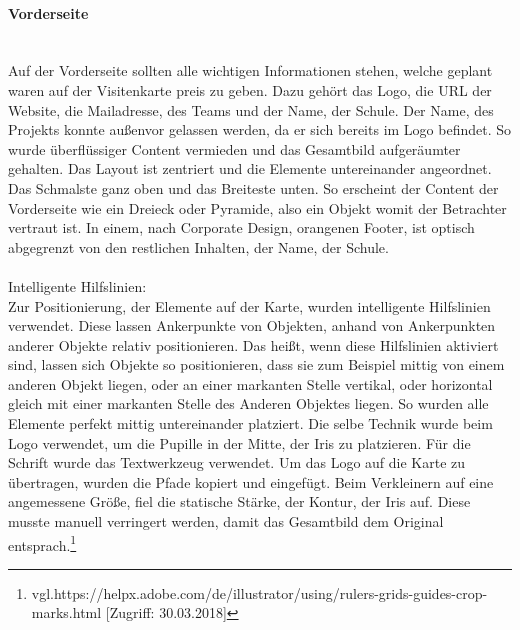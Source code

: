 \paragraph{Vorderseite}
\leavevmode \\
Auf der Vorderseite sollten alle wichtigen Informationen stehen, welche geplant waren auf der Visitenkarte preis zu geben. Dazu gehört das Logo, die URL der Website, die Mailadresse, des Teams und der Name, der Schule. Der Name, des Projekts konnte außenvor gelassen werden, da er sich bereits im Logo befindet. So wurde überflüssiger Content vermieden und das Gesamtbild aufgeräumter gehalten. Das Layout ist zentriert und die Elemente untereinander angeordnet. Das Schmalste ganz oben und das Breiteste unten. So erscheint der Content der Vorderseite wie ein Dreieck oder Pyramide, also ein Objekt womit der Betrachter vertraut ist. In einem, nach Corporate Design, orangenen Footer, ist optisch abgegrenzt von den restlichen Inhalten, der Name, der Schule.
\leavevmode \\
\leavevmode \\
Intelligente Hilfslinien: 
\leavevmode \\
Zur Positionierung, der Elemente auf der Karte, wurden intelligente Hilfslinien verwendet. Diese lassen Ankerpunkte von Objekten, anhand von Ankerpunkten anderer Objekte relativ positionieren. Das heißt, wenn diese Hilfslinien aktiviert sind, lassen sich Objekte so positionieren, dass sie zum Beispiel mittig von einem anderen Objekt liegen, oder an einer markanten Stelle vertikal, oder horizontal gleich mit einer markanten Stelle des Anderen Objektes liegen. So wurden alle Elemente perfekt mittig untereinander platziert. Die selbe Technik wurde beim Logo verwendet, um die Pupille in der Mitte, der Iris zu platzieren. Für die Schrift wurde das Textwerkzeug verwendet. Um das Logo auf die Karte zu übertragen, wurden die Pfade kopiert und eingefügt. Beim Verkleinern auf eine angemessene Größe, fiel die statische Stärke, der Kontur, der Iris auf. Diese musste manuell verringert werden, damit das Gesamtbild dem Original entsprach.\footnote{\label{} vgl.https://helpx.adobe.com/de/illustrator/using/rulers-grids-guides-crop-marks.html [Zugriff: 30.03.2018]}

